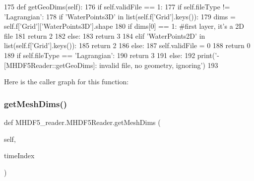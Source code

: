 \begin{DoxyCode}
175     \textcolor{keyword}{def }getGeoDims(self):
176         \textcolor{keywordflow}{if} self.validFile == 1:
177             \textcolor{keywordflow}{if} self.fileType != \textcolor{stringliteral}{'Lagrangian'}:
178                 \textcolor{keywordflow}{if} \textcolor{stringliteral}{'WaterPoints3D'} \textcolor{keywordflow}{in} list(self.f[\textcolor{stringliteral}{'Grid'}].keys()):
179                     dims = self.f[\textcolor{stringliteral}{'Grid'}][\textcolor{stringliteral}{'WaterPoints3D'}].shape
180                     \textcolor{keywordflow}{if} dims[0] == 1: \textcolor{comment}{#first layer, it's a 2D file}
181                         \textcolor{keywordflow}{return} 2
182                     \textcolor{keywordflow}{else}:
183                         \textcolor{keywordflow}{return} 3
184                 \textcolor{keywordflow}{elif} \textcolor{stringliteral}{'WaterPoints2D'} \textcolor{keywordflow}{in} list(self.f[\textcolor{stringliteral}{'Grid'}].keys()):
185                     \textcolor{keywordflow}{return} 2
186                 \textcolor{keywordflow}{else}: 
187                     self.validFile = 0
188                     \textcolor{keywordflow}{return} 0
189             \textcolor{keywordflow}{if} self.fileType == \textcolor{stringliteral}{'Lagrangian'}:
190                 \textcolor{keywordflow}{return} 3
191         \textcolor{keywordflow}{else}:
192             print(\textcolor{stringliteral}{'- [MHDF5Reader::getGeoDims]: invalid file, no geometry, ignoring'})
193             
\end{DoxyCode}
Here is the caller graph for this function\+:
\mbox{\label{class_m_h_d_f5__reader_1_1_m_h_d_f5_reader_aa80431c3897dbff8479ebcdde1676e26}} 
\subsubsection{\texorpdfstring{get\+Mesh\+Dims()}{getMeshDims()}}
{\footnotesize\ttfamily def M\+H\+D\+F5\+\_\+reader.\+M\+H\+D\+F5\+Reader.\+get\+Mesh\+Dims (\begin{DoxyParamCaption}\item[{}]{self,  }\item[{}]{time\+Index }\end{DoxyParamCaption})}



